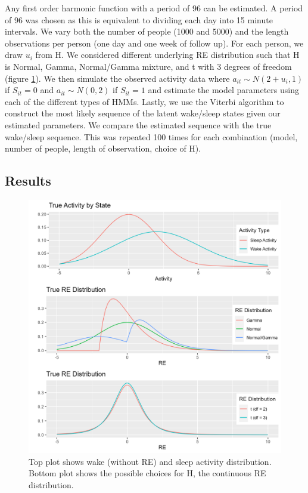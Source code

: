 \documentclass{article}
\begin{document}
Any first order harmonic function with a period of 96 can be estimated. A period of 96 was chosen as this is equivalent to dividing each day into 15 minute intervals. We vary both the number of people (1000 and 5000) and the length observations per person (one day and one week of follow up). For each person, we draw $u_i$ from H. We considered different underlying RE distribution such that H is Normal, Gamma, Normal/Gamma mixture, and t with 3 degrees of freedom (figure \ref{REdist}). We then simulate the observed activity data where $a_{it} \sim N(2+u_i,1)$ if $S_{it}=0$ and $a_{it} \sim N(0,2)$ if $S_{it}=1$ and estimate the model parameters using each of the different types of HMMs. Lastly, we use the Viterbi algorithm to construct the most likely sequence of the latent wake/sleep states given our estimated parameters. We compare the estimated sequence with the true wake/sleep sequence. This was repeated 100 times for each combination (model, number of people, length of observation, choice of H).


\subsection{Results}\label{SimStudyResults}

\begin{figure}
\includegraphics[scale=.5]{Support/REdist.png}
\centering
\caption{Top plot shows wake (without RE) and sleep activity distribution. Bottom plot shows the possible choices for H, the continuous RE distribution.}
\label{REdist}
\end{figure}
\end{document}
